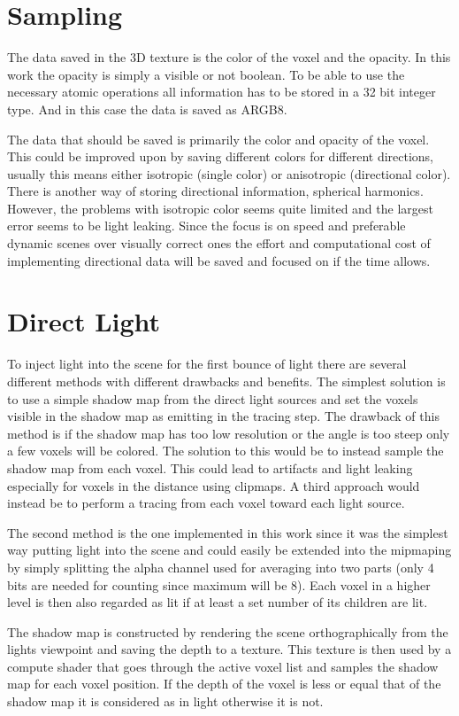\section{Sampling}

The data saved in the 3D texture is the color of the voxel and the opacity. In this work the opacity is simply a visible or not boolean. To be able to use the necessary atomic operations all information has to be stored in a 32 bit integer type. And in this case the data is saved as ARGB8. 

The data that should be saved is primarily the color and opacity of the voxel. This could be improved upon by saving different colors for different directions, usually this means either isotropic (single color) or anisotropic (directional color). There is another way of storing directional information, spherical harmonics. However, the problems with isotropic color seems quite limited and the largest error seems to be light leaking. Since the focus is on speed and preferable dynamic scenes over visually correct ones the effort and computational cost of implementing directional data will be saved and focused on if the time allows.

\section{Direct Light}

To inject light into the scene for the first bounce of light there are several different methods with different drawbacks and benefits. The simplest solution is to use a simple shadow map from the direct light sources and set the voxels visible in the shadow map as emitting in the tracing step. The drawback of this method is if the shadow map has too low resolution or the angle is too steep only a few voxels will be colored. The solution to this would be to instead sample the shadow map from each voxel. This could lead to artifacts and light leaking especially for voxels in the distance using clipmaps. A third approach would instead be to perform a tracing from each voxel toward each light source. 

The second method is the one implemented in this work since it was the simplest way putting light into the scene and could easily be extended into the mipmaping by simply splitting the alpha channel used for averaging into two parts (only 4 bits are needed for counting since maximum will be 8). Each voxel in a higher level is then also regarded as lit if at least a set number of its children are lit.

The shadow map is constructed by rendering the scene orthographically from the lights viewpoint and saving the depth to a texture. This texture is then used by a compute shader that goes through the active voxel list and samples the shadow map for each voxel position. If the depth of the voxel is less or equal that of the shadow map it is considered as in light otherwise it is not.

